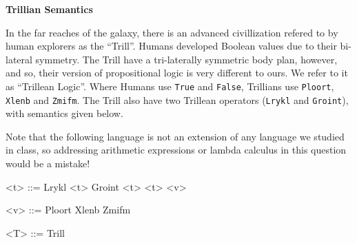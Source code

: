 \documentclass{exam}
\begin{document}
\begin{questions}

\question \textbf{Trillian Semantics}

In the far reaches of the galaxy, there is an advanced civillization refered to by human explorers as the ``Trill''.  Humans developed Boolean values due to their bi-lateral symmetry.  The Trill have a tri-laterally symmetric body plan, however, and so, their version of propositional logic is very different to ours.  We refer to it as ``Trillean Logic''.  Where Humans use \texttt{True} and \texttt{False}, Trillians use \texttt{Ploort}, \texttt{Xlenb} and \texttt{Zmifm}.  The Trill also have two Trillean operators (\texttt{Lrykl} and \texttt{Groint}), with semantics given below.

Note that the following language is not an extension of any language we studied in class, so addressing arithmetic expressions or lambda calculus in this question would be a mistake! 

\begin{grammar}
<t> ::= Lrykl <t> 
\alt Groint <t> <t>
\alt <v>

<v> ::= Ploort
\alt Xlenb
\alt Zmifm

<T> ::= Trill
\end{grammar}


\end{questions}
\end{document}
